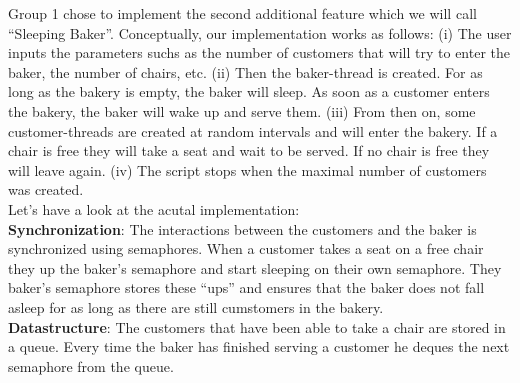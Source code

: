 \documentclass[11pt]{article}
\begin{document}
Group 1 chose to implement the second additional feature which we will call ``Sleeping Baker''. Conceptually, our implementation works as follows: (i) The user inputs the parameters suchs as the number of customers that will try to enter the baker, the number of chairs, etc. (ii) Then the baker-thread is created. For as long as the bakery is empty, the baker will sleep. As soon as a customer enters the bakery, the baker will wake up and serve them. (iii) From then on, some customer-threads are created at random intervals and will enter the bakery. If a chair is free they will take a seat and wait to be served. If no chair is free they will leave again. (iv) The script stops when the maximal number of customers was created.\\

Let's have a look at the acutal implementation:\\

\textbf{Synchronization}: The interactions between the customers and the baker is synchronized using semaphores. When a customer takes a seat on a free chair they up the baker's semaphore and start sleeping on their own semaphore. They baker's semaphore stores these ``ups'' and ensures that the baker does not fall asleep for as long as there are still cumstomers in the bakery.\\

\textbf{Datastructure}: The customers that have been able to take a chair are stored in a queue. Every time the baker has finished serving a customer he deques the next semaphore from the queue.\\
\end{document}
